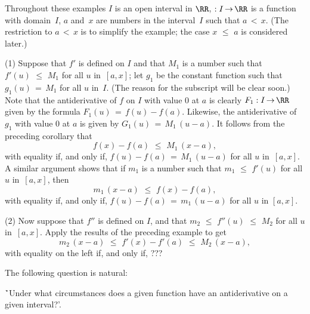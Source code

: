 \V

        Throughout these examples $I$ is an open interval in ${\RR}$, $:I \,{\rightarrow}\, {\RR}$ is a function with domain~$I$,
    $a$ and~$x$ are numbers in the interval~$I$ such that $a\,<\,x$. (The restriction to $a\,<\,x$ is to simplify the example; the case $x\,\,{\leq}\,\,a$ is considered later.)

\V

        (1) Suppose that $f'$ is defined on $I$ and that $M_{1}$ is a number such that $f'(u)\,\,{\leq}\,\,M_{1}$ for all $u$ in~$[a,x]$;
    let $g_{1}$ be the constant function such that $g_{1}(u) \,=\, M_{1}$ for all $u$ in~$I$. (The reason for the subscript will be clear soon.)
    Note that the antiderivative of $f$ on $I$ with value $0$ at $a$ is clearly $F_{1}:I \,{\rightarrow}\, {\RR}$ given by the formula $F_{1}(u) \,=\, f(u)-f(a)$.
    Likewise, the antiderivative of $g_{1}$ with value $0$ at $a$ is given by $G_{1}(u) \,=\, M_{1}\,(u-a)$.
    It follows from the preceding corollary that
        \begin{displaymath}
        f(x) - f(a)\,\,{\leq}\,\,M_{1}\,(x-a),
        \end{displaymath}
    with equality if, and only if, $f(u)-f(a) \,=\, M_{1}\,(u-a)$ for all $u$ in~$[a,x]$.
    A similar argument shows that if $m_{1}$ is a number such that $m_{1}\,\,{\leq}\,\,f'(u)$ for all $u$ in~$[a,x]$, then
        \begin{displaymath}
        m_{1}\,(x-a)\,\,{\leq}\,\,f(x) - f(a),
        \end{displaymath}
    with equality if, and only if, $f(u)-f(a) \,=\, m_{1}\,(u-a)$ for all $u$ in $[a,x]$.

\V

        (2) Now suppose that $f''$ is defined on $I$, and that $m_{2}\,\,{\leq}\,\,f''(u)\,\,{\leq}\,\,M_{2}$ for all $u$ in~$[a,x]$.
    Apply the results of the preceding example to get
        \begin{displaymath}
        m_{2}\,(x-a)\,\,{\leq}\,\,f'(x) - f'(a)\,\,{\leq}\,\,M_{2}\,(x-a),
        \end{displaymath}
    with equality on the left if, and only if, ???

\VV

        The following question is natural:

\VA

        \h `Under what circumstances does a given function have an antiderivative on a given interval?'.

